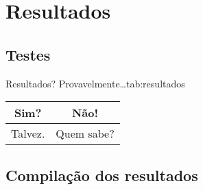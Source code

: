\chapter{Resultados} \label{cap:resultados}
\lipsum[3-5]

\section{Testes} \label{sec:testes}
\lipsum[6]

\begin{standardtable}{Resultados? Provavelmente…}{tab:resultados}
    \begin{tabular}{c|c}
        \toprule
        Sim? & Não! \\
        \midrule
        Talvez. & Quem sabe? \\
        \bottomrule
    \end{tabular} \par
\end{standardtable}

\section{Compilação dos resultados} \label{sec:compilacao_resultados}
\lipsum[7]